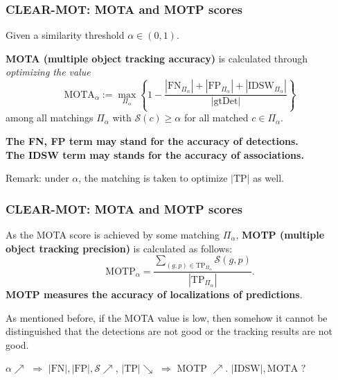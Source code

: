 \documentclass[slidetop, mathserif]{beamer}
\begin{document}
\begin{frame}
	\frametitle{CLEAR-MOT: MOTA and MOTP scores}
			
			
	Given a similarity threshold $\alpha\in (0,1)$.
			
	\vspace{4pt}
			
	{\bf MOTA (multiple object tracking accuracy)} is calculated through
	\emph{optimizing the value}
	\[
		\text{MOTA}_\alpha :=
		\max_{\Pi_\alpha}
		\left\{1 - \dfrac{|\text{FN}_{\Pi_\alpha}| + |\text{FP}_{\Pi_\alpha}| + |\text{IDSW}_{\Pi_\alpha}|}{|\text{gtDet}|}\right\}
	\]
	among all matchings $\Pi_\alpha$ with $\mathcal S(c)\geq \alpha$ for all matched $c\in\Pi_\alpha$.
			
	\vspace{4pt}
			
	{\bf\color{blue} The FN, FP term may stand for the accuracy of detections.} \\
	{\bf\color{olive} The IDSW term may stands for the accuracy of associations.}
			
	\vspace{4pt}
		
	Remark: under $\alpha$, the matching is taken to optimize $|\text{TP}|$ as well.
			
\end{frame}

\begin{frame}
	\frametitle{CLEAR-MOT: MOTA and MOTP scores}
			
	As the MOTA score is achieved by some matching $\Pi_\alpha$, {\bf MOTP (multiple object tracking precision)}
	is calculated as follows:
	\[
		\text{MOTP}_\alpha =
		\dfrac{\sum_{(g,p)\in\text{TP}_{\Pi_\alpha}}\mathcal S(g,p)}{|\text{TP}_{\Pi_\alpha}|}.
	\]
	{\bf\color{red} MOTP measures the accuracy of localizations of predictions}.
			
	\vspace{4pt}
			
	As mentioned before, if the MOTA value is low,
	then somehow it cannot be distinguished that
	the detections are not good or the tracking results are not good.
			
	\vspace{5pt}
		
	$\alpha\nearrow$ $\Rightarrow$ $|\text{FN}|, |\text{FP}|, \mathcal S \nearrow$, $|\text{TP}| \searrow$ $\Rightarrow$ MOTP $\nearrow$.
	$|\text{IDSW}|, \text{MOTA}$ $?$
	
\end{frame}
\end{document}
